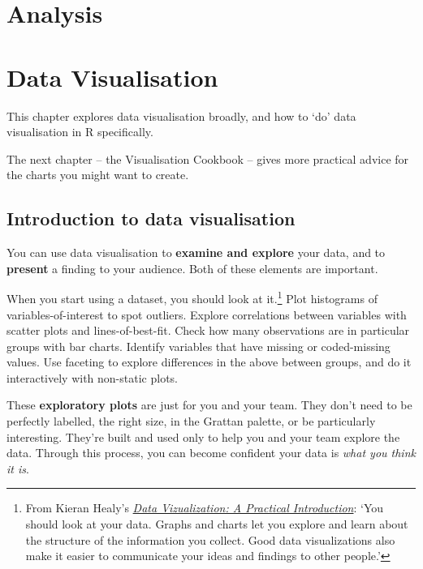 \documentclass[
]{book}
\begin{document}
\hypertarget{analysis}{%
\chapter{Analysis}\label{analysis}}

\hypertarget{data-visualisation}{%
\chapter{Data Visualisation}\label{data-visualisation}}

This chapter explores data visualisation broadly, and how to `do' data visualisation in R specifically.

The next chapter -- the Visualisation Cookbook -- gives more practical advice for the charts you might want to create.

\hypertarget{introduction-to-data-visualisation}{%
\section{Introduction to data visualisation}\label{introduction-to-data-visualisation}}

You can use data visualisation to \textbf{examine and explore} your data, and to \textbf{present} a finding to your audience. Both of these elements are important.

When you start using a dataset, you should look at it.\footnote{From Kieran Healy's \href{https://socviz.co/}{\emph{Data Vizualization: A Practical Introduction}}: `You should look at your data. Graphs and charts let you explore and learn about the structure of the information you collect. Good data visualizations also make it easier to communicate your ideas and findings to other people.'} Plot histograms of variables-of-interest to spot outliers. Explore correlations between variables with scatter plots and lines-of-best-fit. Check how many observations are in particular groups with bar charts. Identify variables that have missing or coded-missing values. Use faceting to explore differences in the above between groups, and do it interactively with non-static plots.

These \textbf{exploratory plots} are just for you and your team. They don't need to be perfectly labelled, the right size, in the Grattan palette, or be particularly interesting.
They're built and used only to help you and your team explore the data.
Through this process, you can become confident your data is \emph{what you think it is}.
\end{document}
